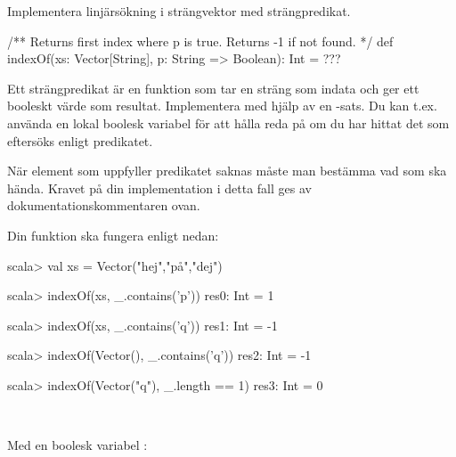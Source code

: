\Subtask Implementera linjärsökning i strängvektor med strängpredikat.
\begin{Code}
/** Returns first index where p is true. Returns -1 if not found. */
def indexOf(xs: Vector[String], p: String => Boolean): Int = ???
\end{Code}
Ett strängpredikat  är en funktion som tar en sträng som indata och ger ett booleskt värde som resultat. Implementera  med hjälp av en -sats. Du kan t.ex. använda en lokal boolesk variabel  för att hålla reda på om du har hittat det som eftersöks enligt predikatet.

När element som uppfyller predikatet saknas måste man bestämma vad som ska hända. Kravet på din implementation i detta fall ges av dokumentationskommentaren ovan.

Din funktion ska fungera enligt nedan:
\begin{REPL}
scala> val xs = Vector("hej","på","dej")

scala> indexOf(xs, _.contains('p'))
res0: Int = 1

scala> indexOf(xs, _.contains('q'))
res1: Int = -1

scala> indexOf(Vector(), _.contains('q'))
res2: Int = -1

scala> indexOf(Vector("q"), _.length == 1)
res3: Int = 0
\end{REPL}

\SOLUTION

\TaskSolved \what~

\SubtaskSolved

\begin{ConceptConnections}

\end{ConceptConnections}

\SubtaskSolved Med en boolesk variabel :

